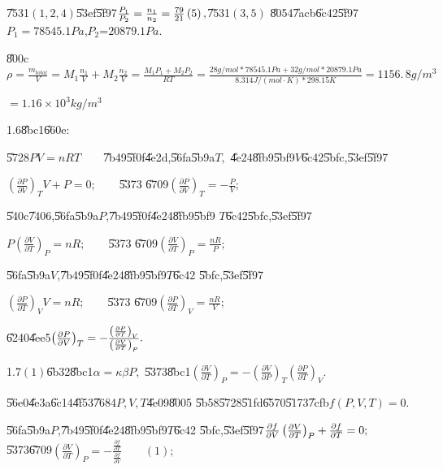 \documentclass{article}
\begin{document}
\U{7531}$\left( 1,2,4\right) $\U{53ef}\U{5f97}$\frac{P_{1}}{P_{2}}=\frac{%
n_{1}}{n_{2}}=\frac{79}{21}\left( 5\right) ,$\U{7531}$\left( 3,5\right) $%
\U{8054}\U{7acb}\U{6c42}\U{5f97}\qquad $P_{1}=78545.1\unit{Pa}$,$P_{2}$=$%
20879.1\unit{Pa}$.

\U{800c}$\rho =\frac{m_{total}}{V}=M_{1}\frac{n_{1}}{V}+M_{2}\frac{n_{2}}{V}=%
\frac{M_{1}P_{1}+M_{2}P_{2}}{RT}=\frac{28\unit{g}/\unit{mol}\ast 78545.1%
\unit{Pa}+32\unit{g}/\unit{mol}\ast 20879.1\unit{Pa}}{8.314\unit{J}/\left( 
\unit{mol}\cdot \unit{K}\right) \ast 298.15\unit{K}}=\allowbreak
1156.\,\allowbreak 8\unit{g}/\unit{m}^{3}$

$=1.16\times 10^{3}\unit{kg}/\unit{m}^{3}$

1.6\qquad \U{8bc1}\U{660e}:

\U{5728}\qquad $PV=nRT\qquad $\U{7b49}\U{5f0f}\U{4e2d},\U{56fa}\U{5b9a}$T,$%
\U{4e24}\U{8fb9}\U{5bf9}$V$\U{6c42}\U{5bfc},\U{53ef}\U{5f97}

$\left( \frac{\partial P}{\partial V}\right) _{T}V+P=0;\qquad $\U{5373}%
\U{6709}\qquad $\left( \frac{\partial P}{\partial V}\right) _{T}=-\frac{P}{V}%
;$

\U{540c}\U{7406},\U{56fa}\U{5b9a}$P$,\U{7b49}\U{5f0f}\U{4e24}\U{8fb9}\U{5bf9}%
$T$\U{6c42}\U{5bfc},\U{53ef}\U{5f97}

$P\left( \frac{\partial V}{\partial T}\right) _{P}=nR;\qquad $\U{5373}%
\U{6709}\qquad $\left( \frac{\partial V}{\partial T}\right) _{P}=\frac{nR}{P}%
;$

\U{56fa}\U{5b9a}$V$,\U{7b49}\U{5f0f}\U{4e24}\U{8fb9}\U{5bf9}$T$\U{6c42}%
\U{5bfc},\U{53ef}\U{5f97}

$\left( \frac{\partial P}{\partial T}\right) _{V}V=nR;\qquad $\U{5373}%
\U{6709}\qquad $\left( \frac{\partial P}{\partial T}\right) _{V}=\frac{nR}{V}%
;$

\U{6240}\U{4ee5}\qquad $\left( \frac{\partial P}{\partial V}\right) _{T}=-%
\frac{\left( \frac{\partial P}{\partial T}\right) _{V}}{\left( \frac{%
\partial V}{\partial T}\right) _{P}}.$

1.7\qquad $\left( 1\right) $\U{6b32}\U{8bc1}\qquad $\alpha =\kappa \beta P,$%
\U{5373}\U{8bc1}\qquad $\left( \frac{\partial V}{\partial T}\right)
_{P}=-\left( \frac{\partial V}{\partial P}\right) _{T}\left( \frac{\partial P%
}{\partial T}\right) _{V}.$

\U{56e0}\U{4e3a}\qquad \U{6c14}\U{4f53}\U{7684}$P,V,T$\U{4e09}\U{8005}%
\U{5b58}\U{5728}\U{51fd}\U{6570}\U{5173}\U{7cfb}\qquad $f\left( P,V,T\right)
=0.$

\U{56fa}\U{5b9a}$P$,\U{7b49}\U{5f0f}\U{4e24}\U{8fb9}\U{5bf9}$T$\U{6c42}%
\U{5bfc},\U{53ef}\U{5f97}\qquad $\frac{\partial f}{\partial V}\left( \frac{%
\partial V}{\partial T}\right) _{P}+\frac{\partial f}{\partial T}=0;\qquad $%
\U{5373}\U{6709}\qquad $\left( \frac{\partial V}{\partial T}\right) _{P}=-%
\frac{\frac{\partial f}{\partial T}}{\frac{\partial f}{\partial V}}\qquad
\left( 1\right) ;$
\end{document}
